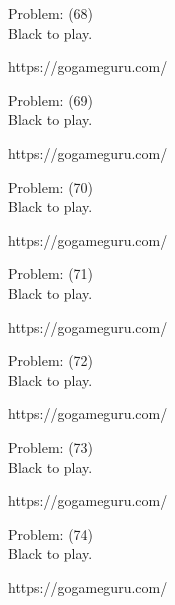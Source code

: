 \documentclass[11pt]{article}
\begin{document}
\begin{minipage}[t]{0.5\textwidth}
  {\centering
  
  Problem: (68)\\
  Black to play.

https://gogameguru.com/\\
  }
\end{minipage}
\begin{minipage}[t]{0.5\textwidth}
  {\centering
  
  Problem: (69)\\
  Black to play.

https://gogameguru.com/\\
  }
\end{minipage}
\begin{minipage}[t]{0.5\textwidth}
  {\centering
  
  Problem: (70)\\
  Black to play.

https://gogameguru.com/\\
  }
\end{minipage}
\begin{minipage}[t]{0.5\textwidth}
  {\centering
  
  Problem: (71)\\
  Black to play.

https://gogameguru.com/\\
  }
\end{minipage}
\begin{minipage}[t]{0.5\textwidth}
  {\centering
  
  Problem: (72)\\
  Black to play.

https://gogameguru.com/\\
  }
\end{minipage}
\begin{minipage}[t]{0.5\textwidth}
  {\centering
  
  Problem: (73)\\
  Black to play.

https://gogameguru.com/\\
  }
\end{minipage}
\begin{minipage}[t]{0.5\textwidth}
  {\centering
  
  Problem: (74)\\
  Black to play.

https://gogameguru.com/\\
  }
\end{minipage}
\end{document}
